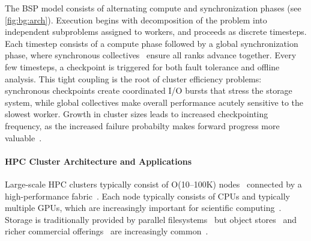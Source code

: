 The BSP model consists of alternating compute and synchronization phases (see \cref{fig:bg:arch}).
Execution begins with decomposition of the problem into independent subproblems assigned to
workers, and proceeds as discrete timesteps.
Each timestep consists of a compute phase followed by a global synchronization phase, where
synchronous collectives~\cite{:MPI, :NCCL} ensure all ranks advance together.
Every few timesteps, a checkpoint is triggered for both fault tolerance and offline analysis.
This tight coupling is the root of cluster efficiency problems: synchronous checkpoints create
coordinated I/O bursts that stress the storage system, while global collectives make overall
performance acutely sensitive to the slowest worker.
Growth in cluster sizes leads to increased checkpointing frequency, as the increased failure
probabilty makes forward progress more valuable~\cite{Jones2012:Checkpointing}.


\paragraph{HPC Cluster Architecture and Applications}
Large-scale HPC clusters typically consist of O(10--100K) nodes~\cite{:TOP500ListJune} connected by
a
high-performance fabric~\cite{Pfist2001:Infiniband,Rowet2022:Slingshot,Metz2024:UltraEthernet}.
Each node typically consists of CPUs and typically multiple GPUs, which are increasingly important
for scientific computing~\cite{DeBar2014:HPCGPU,Snell2017:HPCGPU}.
Storage is traditionally provided by parallel filesystems~\cite{Braam2002:Lustre} but object
stores~\cite{Henne2020:DAOS} and richer commercial offerings~\cite{2024:Hammerspace,:VASTPlatform}
are increasingly common~\cite{Glenn2025:NoPFS}.

